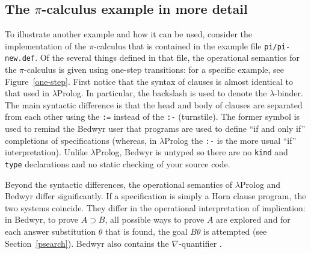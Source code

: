 \documentclass{article}
\providecommand{\texorpdfstring}[2]{#1}
\newcommand{\lp}{$\lambda$Prolog}
\begin{document}
\subsection{The \texorpdfstring{$\pi$}{pi}-calculus example in more detail}
\label{pi-examples}

To illustrate another example and how it
can be used, consider the implementation of the $\pi$-calculus that is
contained in the example file \verb+pi/pi-new.def+.  Of the several
things defined in that file, the operational semantics for the
$\pi$-calculus is given using one-step transitions: for a specific
example, see Figure~\ref{one-step}.  First notice that the syntax of
clauses is almost identical to that used in \lp{}.  In
particular, the backslash is used to denote the $\lambda$-binder.  The
main syntactic difference is that the head and body of clauses are
separated from each other using the \verb+:=+ instead of the
\verb+:-+ (turnstile).  The former symbol is used to remind
the Bedwyr user that programs are used to define ``if and only if''
completions of specifications (whereas, in \lp{} the \verb+:-+ is the
more usual ``if'' interpretation).  Unlike \lp{}, Bedwyr is
untyped so there are no {\tt kind} and {\tt type} declarations and no
static checking of your source code.

Beyond the syntactic differences, the operational semantics of \lp{}
and Bedwyr differ significantly.  If a specification is simply a Horn
clause program, the two systems coincide. They differ in the operational
interpretation of implication: in Bedwyr, to prove $A\supset B$, all
possible ways to prove $A$ are explored and
for each answer substitution $\theta$ that is found, the goal
$B\theta$ is attempted (see Section~\ref{psearch}).  Bedwyr also
contains the $\nabla$-quantifier \cite{miller05tocl}.
\end{document}
